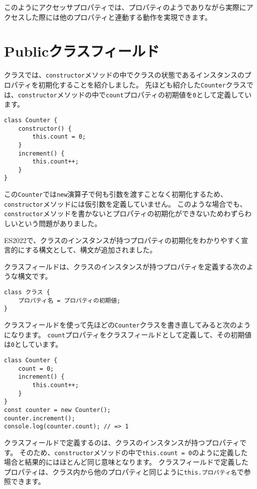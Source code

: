 このようにアクセッサプロパティでは、プロパティのようでありながら実際にアクセスした際には他のプロパティと連動する動作を実現できます。

\hypertarget{public-class-fields}{%
\section{Publicクラスフィールド\,\protect{}}\label{public-class-fields}}

クラスでは、\texttt{constructor}メソッドの中でクラスの状態であるインスタンスのプロパティを初期化することを紹介しました。
先ほども紹介した\texttt{Counter}クラスでは、\texttt{constructor}メソッドの中で\texttt{count}プロパティの初期値を\texttt{0}として定義しています。

\begin{lstlisting}
class Counter {
    constructor() {
        this.count = 0;
    }
    increment() {
        this.count++;
    }
}
\end{lstlisting}

この\texttt{Counter}では\texttt{new}演算子で何も引数を渡すことなく初期化するため、\texttt{constructor}メソッドには仮引数を定義していません。
このような場合でも、\texttt{constructor}メソッドを書かないとプロパティの初期化ができないためわずらわしいという問題がありました。

ES2022で、クラスのインスタンスが持つプロパティの初期化をわかりやすく宣言的にする構文として、\textbf{}構文が追加されました。

クラスフィールドは、クラスのインスタンスが持つプロパティを定義する次のような構文です。

\begin{lstlisting}
class クラス {
    プロパティ名 = プロパティの初期値;
}
\end{lstlisting}

クラスフィールドを使って先ほどの\texttt{Counter}クラスを書き直してみると次のようになります。
\texttt{count}プロパティをクラスフィールドとして定義して、その初期値は\texttt{0}としています。

\begin{lstlisting}
class Counter {
    count = 0;
    increment() {
        this.count++;
    }
}
const counter = new Counter();
counter.increment();
console.log(counter.count); // => 1
\end{lstlisting}

クラスフィールドで定義するのは、クラスのインスタンスが持つプロパティです。
そのため、\texttt{constructor}メソッドの中で\texttt{this.count = 0}のように定義した場合と結果的にはほとんど同じ意味となります。
クラスフィールドで定義したプロパティは、クラス内から他のプロパティと同じように\texttt{this.プロパティ名}で参照できます。

